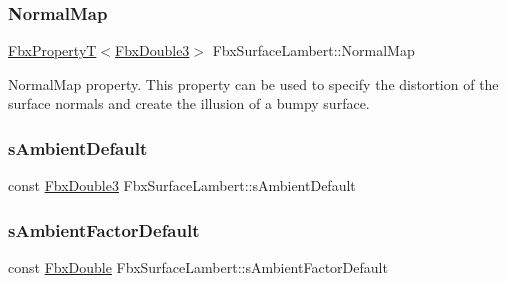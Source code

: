 \subsubsection{\texorpdfstring{Normal\+Map}{NormalMap}}
{\footnotesize\ttfamily \hyperlink{class_fbx_property_t}{Fbx\+PropertyT}$<$\hyperlink{fbxtypes_8h_ae0a96f14cde566774c7553aa7523b7a7}{Fbx\+Double3}$>$ Fbx\+Surface\+Lambert\+::\+Normal\+Map}

Normal\+Map property. This property can be used to specify the distortion of the surface normals and create the illusion of a bumpy surface. \mbox{\label{class_fbx_surface_lambert_adfa8c3d2c37f85133f85da30434cc084}} 
\subsubsection{\texorpdfstring{s\+Ambient\+Default}{sAmbientDefault}}
{\footnotesize\ttfamily const \hyperlink{fbxtypes_8h_ae0a96f14cde566774c7553aa7523b7a7}{Fbx\+Double3} Fbx\+Surface\+Lambert\+::s\+Ambient\+Default\hspace{0.3cm}{\ttfamily [static]}}

\mbox{\label{class_fbx_surface_lambert_aaff9847a26203491fd997d015b83c32a}} 
\subsubsection{\texorpdfstring{s\+Ambient\+Factor\+Default}{sAmbientFactorDefault}}
{\footnotesize\ttfamily const \hyperlink{fbxtypes_8h_a171e72a1c46fc15c1a6c9c31948c1c5b}{Fbx\+Double} Fbx\+Surface\+Lambert\+::s\+Ambient\+Factor\+Default\hspace{0.3cm}{\ttfamily [static]}}

\mbox{\label{class_fbx_surface_lambert_a01c993fda940a303bff4cc04baa98d6c}} 
